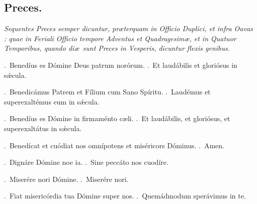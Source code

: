 \documentclass[12pt]{article} %
\def\noinitial{%
\gresetfirstlineaboveinitial{\textcolor{benred8}{\small \textsc{\textbf{}}}}{\textcolor{benred8}{\small \textsc{\textbf{}}}}
\setspaceafterinitial{0pt plus 0em minus 0em}%
\setspacebeforeinitial{0pt plus 0em minus 0em}%
\relax %
}
\newenvironment{rubric}{\vspace{2 mm}\color{benred8} \itshape \leftskip 0in \setlength{\parindent}{0.25in}}{\vspace{2 mm}}
\newenvironment{response}{\leftskip 0in \setlength{\parindent}{0in}}{\vspace{2 mm}}
\let\oldVbar\Vbar
\renewcommand{\Vbar}{\textcolor{benred8}{\oldVbar .}}
\let\oldRbar\Rbar
\renewcommand{\Rbar}{\textcolor{benred8}{\oldRbar .}}
\begin{document}
{\noinitial
{}

}

\newpage


\subsection*{Preces.}

\begin{rubric}
Sequentes Preces semper dicuntur, pr\ae terquam in Officio Duplici, et infra Oavas : quae in Feriali Officio tempore Adventus et Quadragesim\ae, et in Quatuor Temporibus, quando di\ae\ sunt Preces in Vesperis, dicuntur flexis genibus.

\end{rubric}

\gresetfirstlineaboveinitial{\small \textsc{ \textbf{\textcolor{benred8}{\Vbar}}}}{\small \textsc{ \textbf{\textcolor{benred8}{\Vbar}}}}

\vspace{2mm}

\gresetfirstlineaboveinitial{\small \textsc{ \textbf{\textcolor{benred8}{\Vbar}}}}{\small \textsc{ \textbf{\textcolor{benred8}{\Vbar}}}}

\vspace{2mm}

\gresetfirstlineaboveinitial{\small \textsc{ \textbf{\textcolor{benred8}{\Vbar}}}}{\small \textsc{ \textbf{\textcolor{benred8}{\Vbar}}}}

\begin{response}
\Vbar\ Bened\'{i}us es D\'{o}mine Deus patrum nor\'{o}rum.
\Rbar\ Et laud\'{a}bilis et glori\'{o}sus in s\'{\ae}cula.

\Vbar\ Benedic\'{a}mus Patrem et F\'{i}lium cum Sano Sp\'{i}ritu.
\Rbar\ Laud\'{e}mus et superexalt\'{e}mus eum in s\'{\ae}cula.

\Vbar\ Bened\'{i}us es D\'{o}mine in firmam\'{e}nto c\ae li.
\Rbar\ Et laud\'{a}bilis, et glori\'{o}sus, et superexalt\'{a}tus in s\'{\ae}cula.

\Vbar\ Bened\'{i}cat et cu\'{o}diat nos omn\'{i}potens et mis\'{e}ricors D\'{o}minus.
\Rbar\ Amen.

\Vbar\ Dign\'{a}re D\'{o}mine noe ia.
\Rbar\ Sine pecc\'{a}to nos cuod\'{i}re.

\Vbar\ Miser\'{e}re nori D\'{o}mine.
\Rbar\ Miser\'{e}re nori.

\Vbar\ Fiat miseric\'{o}rdia tua D\'{o}mine super nos. 
\Rbar\ Quem\'{a}dmodum sper\'{a}vimus in te.

\end{response}
\end{document}
